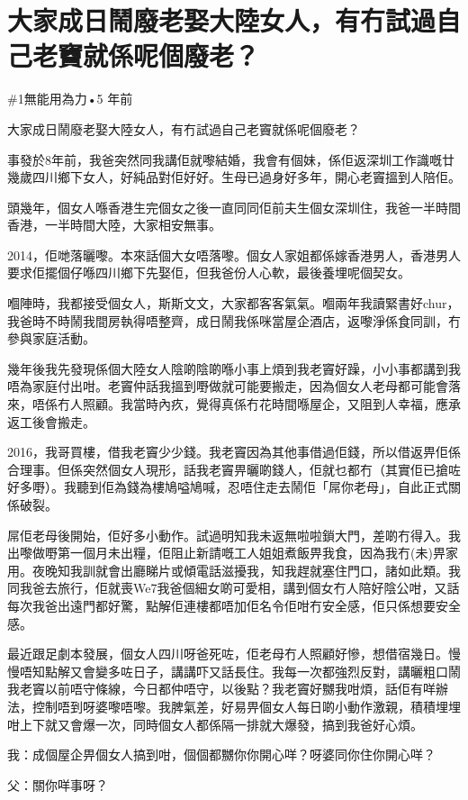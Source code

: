 \chapter{大家成日鬧廢老娶大陸女人，有冇試過自己老竇就係呢個廢老？}

\#1無能用為力•5 年前

大家成日鬧廢老娶大陸女人，有冇試過自己老竇就係呢個廢老？

事發於8年前，我爸突然同我講佢就嚟結婚，我會有個妹，係佢返深圳工作識嘅廿幾歲四川鄉下女人，好純品對佢好好。生母已過身好多年，開心老竇搵到人陪佢。

頭幾年，個女人喺香港生完個女之後一直同同佢前夫生個女深圳住，我爸一半時間香港，一半時間大陸，大家相安無事。

2014，佢哋落曬嚟。本來話個大女唔落嚟。個女人家姐都係嫁香港男人，香港男人要求佢擺個仔喺四川鄉下先娶佢，但我爸份人心軟，最後養埋呢個契女。

嗰陣時，我都接受個女人，斯斯文文，大家都客客氣氣。嗰兩年我讀緊書好chur，我爸時不時鬧我間房執得唔整齊，成日鬧我係咪當屋企酒店，返嚟淨係食同訓，冇參與家庭活動。

幾年後我先發現係個大陸女人陰啲陰啲喺小事上煩到我老竇好躁，小小事都講到我唔為家庭付出咁。老竇仲話我搵到嘢做就可能要搬走，因為個女人老母都可能會落來，唔係冇人照顧。我當時內疚，覺得真係冇花時間喺屋企，又阻到人幸福，應承返工後會搬走。

2016，我哥買樓，借我老竇少少錢。我老竇因為其他事借過佢錢，所以借返畀佢係合理事。但係突然個女人現形，話我老竇畀曬啲錢人，佢就乜都冇（其實佢已搶咗好多嘢）。我聽到佢為錢為樓鳩嗌鳩喊，忍唔住走去鬧佢「屌你老母」，自此正式關係破裂。

屌佢老母後開始，佢好多小動作。試過明知我未返無啦啦鎖大門，差啲冇得入。我出嚟做嘢第一個月未出糧，佢阻止新請嘅工人姐姐煮飯畀我食，因為我冇(未)畀家用。夜晚知我訓就會出廳睇片或傾電話滋擾我，知我趕就塞住門口，諸如此類。我同我爸去旅行，佢就喪We7我爸個細女啲可愛相，講到個女冇人陪好陰公咁，又話每次我爸出遠門都好驚，點解佢連樓都唔加佢名令佢咁冇安全感，佢只係想要安全感。

最近跟足劇本發展，個女人四川呀爸死咗，佢老母冇人照顧好慘，想借宿幾日。慢慢唔知點解又會變多咗日子，講講吓又話長住。我每一次都強烈反對，講曬粗口鬧我老竇以前唔守條線，今日都仲唔守，以後點？我老竇好嬲我咁煩，話佢有咩辦法，控制唔到呀婆嚟唔嚟。我脾氣差，好易畀個女人每日啲小動作激親，積積埋埋咁上下就又會爆一次，同時個女人都係隔一排就大爆發，搞到我爸好心煩。

我：成個屋企畀個女人搞到咁，個個都嬲你你開心咩？呀婆同你住你開心咩？

父：關你咩事呀？

